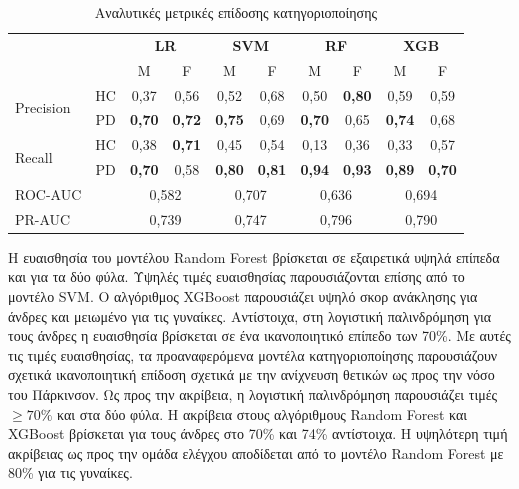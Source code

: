 \documentclass[12pt]{report}
\begin{document}
                \begin{table}[H]
                    \centering
                    \setlength{\tabcolsep}{4pt} 
                    \begin{tabular}{lccccccccc}
                        \multirow{2}{*}{} & \multirow{2}{*}{} & \multicolumn{2}{c}{\textbf{LR}} & \multicolumn{2}{c}{\textbf{SVM}} & \multicolumn{2}{c}{\textbf{RF}} & \multicolumn{2}{c}{\textbf{XGB}} \\
                        & & M & F & M & F & M & F & M & F \\
                        \midrule
                        \multirow{2}{*}{Precision} 
                            & HC & 0,37 & 0,56 & 0,52 & 0,68 & 0,50 & \textbf{0,80} & 0,59 & 0,59 \\
                            & PD & \textbf{0,70} & \textbf{0,72} & \textbf{0,75} & 0,69 & \textbf{0,70} & 0,65 & \textbf{0,74} & 0,68 \\
                        \multirow{2}{*}{Recall}
                            & HC & 0,38 & \textbf{0,71} & 0,45 & 0,54 & 0,13 & 0,36 & 0,33 & 0,57 \\
                            & PD & \textbf{0,70} & 0,58 & \textbf{0,80} & \textbf{0,81} & \textbf{0,94} & \textbf{0,93} & \textbf{0,89} & \textbf{0,70} \\
                        \midrule
                        ROC-AUC & & \multicolumn{2}{c}{0,582} & \multicolumn{2}{c}{0,707} & \multicolumn{2}{c}{0,636} & \multicolumn{2}{c}{0,694} \\
                        PR-AUC & & \multicolumn{2}{c}{0,739} & \multicolumn{2}{c}{0,747} & \multicolumn{2}{c}{0,796} & \multicolumn{2}{c}{0,790} \\
                    \end{tabular}
                    \caption{Αναλυτικές μετρικές επίδοσης κατηγοριοποίησης}
                    \label{tab:ml-classification-metrics-detailed}
                \end{table}
                \par
                    Η ευαισθησία του μοντέλου Random Forest βρίσκεται σε εξαιρετικά υψηλά επίπεδα και για τα δύο φύλα. Υψηλές τιμές ευαισθησίας παρουσιάζονται επίσης από το μοντέλο SVM. Ο αλγόριθμος XGBoost παρουσιάζει υψηλό σκορ ανάκλησης για άνδρες και μειωμένο για τις γυναίκες. Αντίστοιχα, στη λογιστική παλινδρόμηση για τους άνδρες η ευαισθησία βρίσκεται σε ένα ικανοποιητικό  επίπεδο των 70\%. Με αυτές τις τιμές ευαισθησίας, τα προαναφερόμενα μοντέλα κατηγοριοποίησης παρουσιάζουν σχετικά ικανοποιητική επίδοση σχετικά με την ανίχνευση θετικών ως προς την νόσο του Πάρκινσον. Ως προς την ακρίβεια, η λογιστική παλινδρόμηση παρουσιάζει τιμές $\geq70\%$ και στα δύο φύλα. Η ακρίβεια στους αλγόριθμους Random Forest και XGBoost βρίσκεται για τους άνδρες στο 70\% και 74\% αντίστοιχα. Η υψηλότερη τιμή ακρίβειας ως προς την ομάδα ελέγχου αποδίδεται από το μοντέλο Random Forest με 80\% για τις γυναίκες.
\end{document}
